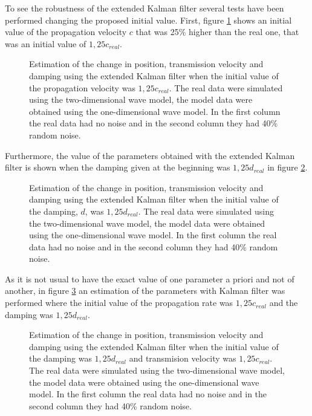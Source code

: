 \documentclass[12pt, a4paper]{article} %
\begin{document}
	\newpage
	To see the robustness of the extended Kalman filter several tests have been performed changing the proposed initial value.  
	First, figure \ref{fig:kalman1c} shows an initial value of the propagation velocity $c$ that was 25\% higher than the real one, that was an initial value of $1,25 c_{real}$.
	
	\begin{figure}[h!]
		\centering
		
		\caption{Estimation of the change in position, transmission velocity and damping using the extended Kalman filter when the initial value of the propagation velocity was $1,25 c_{real}$. The real data were simulated using the two-dimensional wave model, the model data were obtained using the one-dimensional wave model. In the first column the real data had no noise and in the second column they had 40\% random noise.}
		\label{fig:kalman1c}
	\end{figure}
	
	\newpage
	Furthermore, the value of the parameters obtained with the extended Kalman filter is shown when the damping given at the beginning was $1,25 d_{real}$ in figure \ref{fig:kalman1d}.
	
	\begin{figure}[h!]
		\centering
		
		\caption{Estimation of the change in position, transmission velocity and damping using the extended Kalman filter when the initial value of the damping, $d$, was $ 1,25 d_{real}$. The real data were simulated using the two-dimensional wave model, the model data were obtained using the one-dimensional wave model. In the first column the real data had no noise and in the second column they had 40\% random noise.}
		\label{fig:kalman1d}
	\end{figure}
	
	\newpage
	
	As it is not usual to have the exact value of one parameter a priori and not of another, in figure \ref{fig:kalman1dc} an estimation of the parameters with Kalman filter was performed where the initial value of the propagation rate was $1,25 c_{real}$ and the damping was $1,25 d_{real}$.
	
	\newpage
	
	\begin{figure}[h!]
		\centering
		
		\caption{Estimation of the change in position, transmission velocity and damping using the extended Kalman filter when the initial value of the damping was $1,25 d_{real}$ and transmision velocity was $1,25 c_{real}$. The real data were simulated using the two-dimensional wave model, the model data were obtained using the one-dimensional wave model. In the first column the real data had no noise and in the second column they had 40\% random noise.}
		\label{fig:kalman1dc}
	\end{figure}
	
\end{document}
